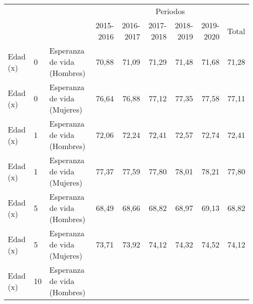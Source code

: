 \begin{tabular}{lllllllll}
\cline{1-9}
\multicolumn{1}{c}{} &
  \multicolumn{1}{c}{} &
  \multicolumn{1}{c}{} &
  \multicolumn{6}{|c}{Periodos} \\
\multicolumn{1}{c}{} &
  \multicolumn{1}{c}{} &
  \multicolumn{1}{c}{} &
  \multicolumn{1}{|r}{2015-2016} &
  \multicolumn{1}{r}{2016-2017} &
  \multicolumn{1}{r}{2017-2018} &
  \multicolumn{1}{r}{2018-2019} &
  \multicolumn{1}{r}{2019-2020} &
  \multicolumn{1}{r}{Total} \\
\cline{1-9}
\multicolumn{1}{l}{Edad (x)} &
  \multicolumn{1}{l}{0} &
  \multicolumn{1}{l}{Esperanza de vida (Hombres)} &
  \multicolumn{1}{|r}{70,88} &
  \multicolumn{1}{r}{71,09} &
  \multicolumn{1}{r}{71,29} &
  \multicolumn{1}{r}{71,48} &
  \multicolumn{1}{r}{71,68} &
  \multicolumn{1}{r}{71,28} \\
\multicolumn{1}{l}{Edad (x)} &
  \multicolumn{1}{l}{0} &
  \multicolumn{1}{l}{Esperanza de vida (Mujeres)} &
  \multicolumn{1}{|r}{76,64} &
  \multicolumn{1}{r}{76,88} &
  \multicolumn{1}{r}{77,12} &
  \multicolumn{1}{r}{77,35} &
  \multicolumn{1}{r}{77,58} &
  \multicolumn{1}{r}{77,11} \\
\multicolumn{1}{l}{Edad (x)} &
  \multicolumn{1}{l}{1} &
  \multicolumn{1}{l}{Esperanza de vida (Hombres)} &
  \multicolumn{1}{|r}{72,06} &
  \multicolumn{1}{r}{72,24} &
  \multicolumn{1}{r}{72,41} &
  \multicolumn{1}{r}{72,57} &
  \multicolumn{1}{r}{72,74} &
  \multicolumn{1}{r}{72,41} \\
\multicolumn{1}{l}{Edad (x)} &
  \multicolumn{1}{l}{1} &
  \multicolumn{1}{l}{Esperanza de vida (Mujeres)} &
  \multicolumn{1}{|r}{77,37} &
  \multicolumn{1}{r}{77,59} &
  \multicolumn{1}{r}{77,80} &
  \multicolumn{1}{r}{78,01} &
  \multicolumn{1}{r}{78,21} &
  \multicolumn{1}{r}{77,80} \\
\multicolumn{1}{l}{Edad (x)} &
  \multicolumn{1}{l}{5} &
  \multicolumn{1}{l}{Esperanza de vida (Hombres)} &
  \multicolumn{1}{|r}{68,49} &
  \multicolumn{1}{r}{68,66} &
  \multicolumn{1}{r}{68,82} &
  \multicolumn{1}{r}{68,97} &
  \multicolumn{1}{r}{69,13} &
  \multicolumn{1}{r}{68,82} \\
\multicolumn{1}{l}{Edad (x)} &
  \multicolumn{1}{l}{5} &
  \multicolumn{1}{l}{Esperanza de vida (Mujeres)} &
  \multicolumn{1}{|r}{73,71} &
  \multicolumn{1}{r}{73,92} &
  \multicolumn{1}{r}{74,12} &
  \multicolumn{1}{r}{74,32} &
  \multicolumn{1}{r}{74,52} &
  \multicolumn{1}{r}{74,12} \\
\multicolumn{1}{l}{Edad (x)} &
  \multicolumn{1}{l}{10} &
  \multicolumn{1}{l}{Esperanza de vida (Hombres)} &

\end{tabular}
